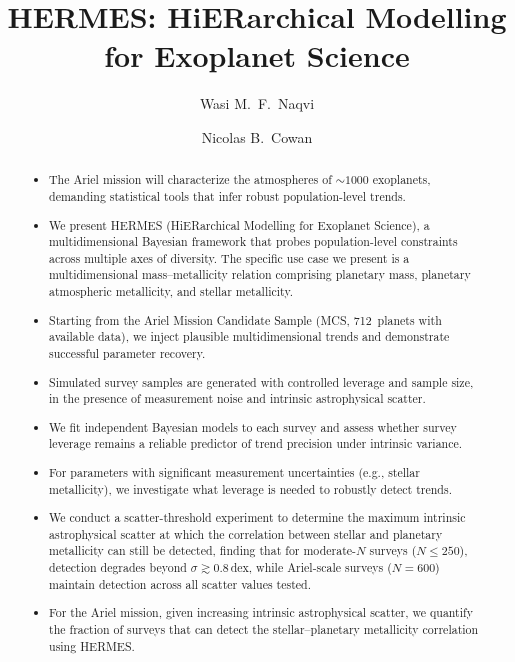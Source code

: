 \documentclass[twocolumn]{aastex631}
\begin{document}
\title{HERMES: HiERarchical Modelling\\
       for Exoplanet Science}

\author{Wasi M.\ F.\ Naqvi}

\author{Nicolas B.\ Cowan}

\begin{abstract}
\begin{itemize}
    \item The Ariel mission will characterize the atmospheres of
          $\sim\!1000$ exoplanets, demanding statistical tools that
          infer robust population-level trends.
    \item We present HERMES (HiERarchical Modelling for Exoplanet
          Science), a multidimensional Bayesian framework that probes
          population-level constraints across multiple axes of diversity.
          The specific use case we present is a multidimensional
          mass--metallicity relation comprising planetary mass, planetary
          atmospheric metallicity, and stellar metallicity.
    \item Starting from the Ariel Mission Candidate Sample (MCS,
          712~planets with available data), we inject plausible
          multidimensional trends and demonstrate successful parameter
          recovery.
    \item Simulated survey samples are generated with controlled
          leverage and sample size, in the presence of measurement
          noise and intrinsic astrophysical scatter.
    \item We fit independent Bayesian models to each survey and assess
          whether survey leverage remains a reliable predictor of trend
          precision under intrinsic variance.
    \item For parameters with significant measurement uncertainties
          (e.g., stellar metallicity), we investigate what leverage is
          needed to robustly detect trends.
    \item We conduct a scatter-threshold experiment to determine the
          maximum intrinsic astrophysical scatter at which the
          correlation between stellar and planetary metallicity can
          still be detected, finding that for moderate-$N$ surveys
          ($N \leq 250$), detection degrades beyond
          $\sigma \gtrsim 0.8$\,dex, while Ariel-scale surveys
          ($N = 600$) maintain detection across all scatter values
          tested.
    \item For the Ariel mission, given increasing intrinsic
          astrophysical scatter, we quantify the fraction of surveys
          that can detect the stellar--planetary metallicity
          correlation using HERMES.
\end{itemize}
\end{abstract}
\end{document}
